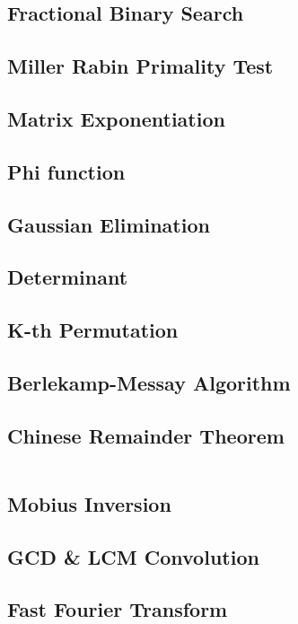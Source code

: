 \newpage

\subsection{Fractional Binary Search}
\subsection{Miller Rabin Primality Test}
\subsection{Matrix Exponentiation}
\subsection{Phi function}
\subsection{Gaussian Elimination}
\subsection{Determinant}
\subsection{K-th Permutation}
\subsection{Berlekamp-Messay Algorithm}
\subsection{Chinese Remainder Theorem}

\hrulefill
\begin{multicols}{2}
\inputminted[autogobble,fontsize=\footnotesize]{C++}{Maths/crt.cpp}
\end{multicols}
\hrulefill

\subsection{Mobius Inversion}
\subsection{GCD \& LCM Convolution}
\subsection{Fast Fourier Transform} 
